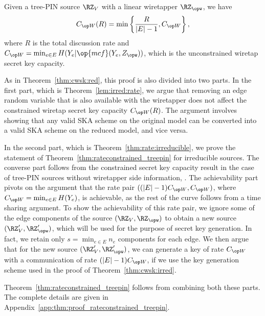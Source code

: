 \begin{theorem}\label{thm:rateconstrained_treepin}
Given a tree-PIN source $\RZ_V$ with a linear wiretapper $\RZ_{\opw}$, we have
\begin{align*}
\wskc(R) = \min \left\{\frac{R}{|E|-1}, \wskc\right\},
\end{align*}
where $R$ is the total discussion rate and $\wskc =\min_{e \in E}H(Y_e|\op{mcf}(Y_e,Z_{\opw}))$, which is the unconstrained wiretap secret key capacity.
\end{theorem}


\begin{IEEEproof}
As in Theorem~\ref{thm:cwsk:red}, this proof is also divided into two parts. In the first part, which is 
Theorem~\ref{lem:irred:rate}, we argue that removing an edge random variable that is also available with the wiretapper does not affect the constrained wiretap secret key capacity $\wskc(R)$. The argument involves showing that any valid SKA scheme on the original model can be converted into a valid SKA scheme on the reduced model, and vice versa.

In the second part, which is Theorem~\ref{thm:rate:irreducible}, we prove the statement of Theorem~\ref{thm:rateconstrained_treepin} for irreducible sources. The converse part follows from the constrained secret key capacity result in the case of tree-PIN sources without wiretapper side information, \cite[Theorem~4.2]{chan19}. The achievability part pivots on the argument that the rate pair $((|E|-1)\wskc,\wskc)$, where $\wskc=\min_{e \in E}H(Y_e)$, is achievable, as the rest of the curve follows from a time sharing argument.
To show the achievability of this rate pair, we ignore some of the edge components of the source $(\RZ_V, \RZ_{\opw})$ to obtain a new source $(\RZ'_V, \RZ'_{\opw})$, which will be used for the purpose of secret key generation. In fact, we retain only $s=\min_{e \in E}n_e$ components for each edge. We then argue that for the new source $(\RZ'_V, \RZ'_{\opw})$, we can generate a key of rate $\wskc$ with a communication of rate $(|E|-1)\wskc$, if we use the key generation scheme used in the proof of Theorem~\ref{thm:cwsk:irred}.

Theorem~\ref{thm:rateconstrained_treepin} follows from combining both these parts. The complete details are given in Appendix~\ref{app:thm:proof_rateconstrained_treepin}.
\end{IEEEproof}

